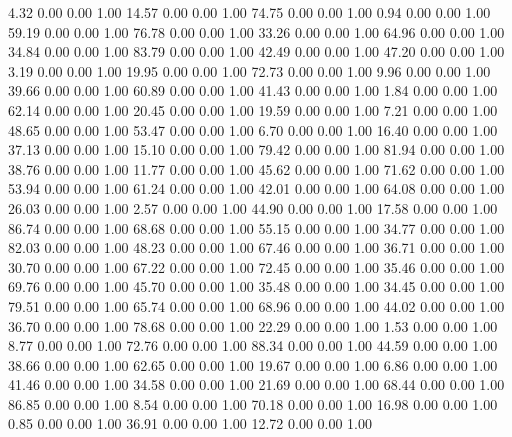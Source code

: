     4.32   0.00   0.00   1.00
   14.57   0.00   0.00   1.00
   74.75   0.00   0.00   1.00
    0.94   0.00   0.00   1.00
   59.19   0.00   0.00   1.00
   76.78   0.00   0.00   1.00
   33.26   0.00   0.00   1.00
   64.96   0.00   0.00   1.00
   34.84   0.00   0.00   1.00
   83.79   0.00   0.00   1.00
   42.49   0.00   0.00   1.00
   47.20   0.00   0.00   1.00
    3.19   0.00   0.00   1.00
   19.95   0.00   0.00   1.00
   72.73   0.00   0.00   1.00
    9.96   0.00   0.00   1.00
   39.66   0.00   0.00   1.00
   60.89   0.00   0.00   1.00
   41.43   0.00   0.00   1.00
    1.84   0.00   0.00   1.00
   62.14   0.00   0.00   1.00
   20.45   0.00   0.00   1.00
   19.59   0.00   0.00   1.00
    7.21   0.00   0.00   1.00
   48.65   0.00   0.00   1.00
   53.47   0.00   0.00   1.00
    6.70   0.00   0.00   1.00
   16.40   0.00   0.00   1.00
   37.13   0.00   0.00   1.00
   15.10   0.00   0.00   1.00
   79.42   0.00   0.00   1.00
   81.94   0.00   0.00   1.00
   38.76   0.00   0.00   1.00
   11.77   0.00   0.00   1.00
   45.62   0.00   0.00   1.00
   71.62   0.00   0.00   1.00
   53.94   0.00   0.00   1.00
   61.24   0.00   0.00   1.00
   42.01   0.00   0.00   1.00
   64.08   0.00   0.00   1.00
   26.03   0.00   0.00   1.00
    2.57   0.00   0.00   1.00
   44.90   0.00   0.00   1.00
   17.58   0.00   0.00   1.00
   86.74   0.00   0.00   1.00
   68.68   0.00   0.00   1.00
   55.15   0.00   0.00   1.00
   34.77   0.00   0.00   1.00
   82.03   0.00   0.00   1.00
   48.23   0.00   0.00   1.00
   67.46   0.00   0.00   1.00
   36.71   0.00   0.00   1.00
   30.70   0.00   0.00   1.00
   67.22   0.00   0.00   1.00
   72.45   0.00   0.00   1.00
   35.46   0.00   0.00   1.00
   69.76   0.00   0.00   1.00
   45.70   0.00   0.00   1.00
   35.48   0.00   0.00   1.00
   34.45   0.00   0.00   1.00
   79.51   0.00   0.00   1.00
   65.74   0.00   0.00   1.00
   68.96   0.00   0.00   1.00
   44.02   0.00   0.00   1.00
   36.70   0.00   0.00   1.00
   78.68   0.00   0.00   1.00
   22.29   0.00   0.00   1.00
    1.53   0.00   0.00   1.00
    8.77   0.00   0.00   1.00
   72.76   0.00   0.00   1.00
   88.34   0.00   0.00   1.00
   44.59   0.00   0.00   1.00
   38.66   0.00   0.00   1.00
   62.65   0.00   0.00   1.00
   19.67   0.00   0.00   1.00
    6.86   0.00   0.00   1.00
   41.46   0.00   0.00   1.00
   34.58   0.00   0.00   1.00
   21.69   0.00   0.00   1.00
   68.44   0.00   0.00   1.00
   86.85   0.00   0.00   1.00
    8.54   0.00   0.00   1.00
   70.18   0.00   0.00   1.00
   16.98   0.00   0.00   1.00
    0.85   0.00   0.00   1.00
   36.91   0.00   0.00   1.00
   12.72   0.00   0.00   1.00
